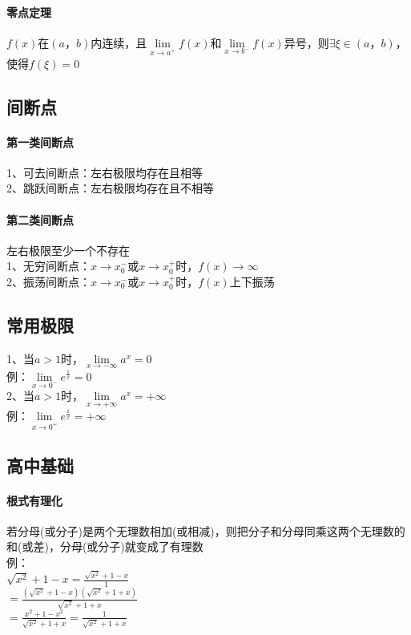 \documentclass{article}
\begin{document}
\begin{flushleft}
	\paragraph{零点定理}
	$f(x)$在$(a，b)$内连续，且$\lim\limits_{x\to a^+} f(x)$和$\lim\limits_{x\to b^-} f(x)$异号，则$\exists \xi \in (a，b)$，使得$f(\xi)=0$\\
	
	\subsection{间断点}
	
	\paragraph{第一类间断点}
	1、可去间断点：左右极限均存在且相等\\
	2、跳跃间断点：左右极限均存在且不相等\\
	\paragraph{第二类间断点}
	左右极限至少一个不存在\\
	1、无穷间断点：$x\to x_0^-$或$x\to x_0^+$时，$f(x)\to \infty$\\
	2、振荡间断点：$x\to x_0^-$或$x\to x_0^+$时，$f(x)$上下振荡\\
	
	\subsection{常用极限}
	
	1、当$a>1$时，$\lim\limits_{x\to-\infty}a^x=0$\\
	\qquad 例：$\lim\limits_{x\to 0^-}e^{\frac{1}{x}}=0$\\
	2、当$a>1$时，$\lim\limits_{x\to+\infty}a^x=+\infty$\\
	\qquad 例：$\lim\limits_{x\to 0^+}e^{\frac{1}{x}}=+\infty$
	
	\subsection{高中基础}
	
	\paragraph{根式有理化}
	若分母(或分子)是两个无理数相加(或相减)，则把分子和分母同乘这两个无理数的和(或差)，分母(或分子)就变成了有理数\\
	例：\\
	\qquad $\sqrt{x^2}+1-x=\frac{\sqrt{x^2}+1-x}{1}$\\
	\qquad $=\frac{(\sqrt{x^2}+1-x)(\sqrt{x^2}+1+x)}{\sqrt{x^2}+1+x}$\\
	\qquad $=\frac{x^2+1-x^2}{\sqrt{x^2}+1+x}=\frac{1}{\sqrt{x^2}+1+x}$\\
	

\end{flushleft}
\end{document}
